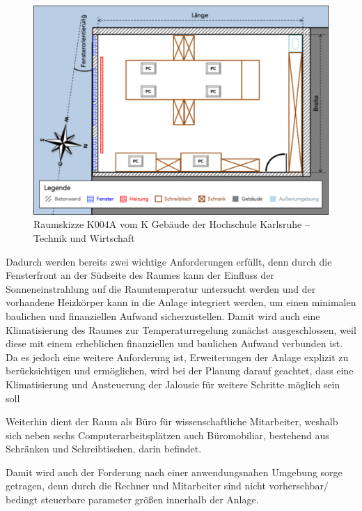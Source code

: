 \begin{figure}
\centering
\includegraphics[width=\textwidth]{abbildungen/20160102_k004a}
\caption[Raumskizze K004A vom K Gebäude der Hochschule Karlsruhe -- Technik und Wirtschaft]{Raumskizze K004A vom K Gebäude der Hochschule Karlsruhe -- Technik und Wirtschaft}
\label{fig:skizzek004a}
\end{figure}

Dadurch werden bereits zwei wichtige Anforderungen erfüllt, denn durch die Fensterfront an der Südseite des Raumes kann der Einfluss der Sonneneinstrahlung auf die Raumtemperatur untersucht werden und der vorhandene Heizkörper kann in die Anlage integriert werden, um einen minimalen baulichen und finanziellen Aufwand sicherzustellen.
Damit wird auch eine Klimatisierung des Raumes zur Temperaturregelung zunächst ausgeschlossen, weil diese mit einem erheblichen finanziellen und baulichen Aufwand verbunden ist. Da es jedoch eine weitere Anforderung ist, Erweiterungen der Anlage explizit zu berücksichtigen und ermöglichen, wird bei der Planung darauf geachtet, dass eine Klimatisierung und Ansteuerung der Jalousie für weitere Schritte möglich sein soll

Weiterhin dient der Raum als Büro für wissenschaftliche Mitarbeiter, weshalb sich neben sechs Computerarbeitsplätzen auch Büromobiliar, bestehend aus Schränken und Schreibtischen, darin befindet.

Damit wird auch der Forderung nach einer anwendungsnahen Umgebung sorge getragen, denn durch die Rechner und Mitarbeiter sind nicht vorhersehbar/ bedingt steuerbare parameter größen innerhalb der Anlage.

